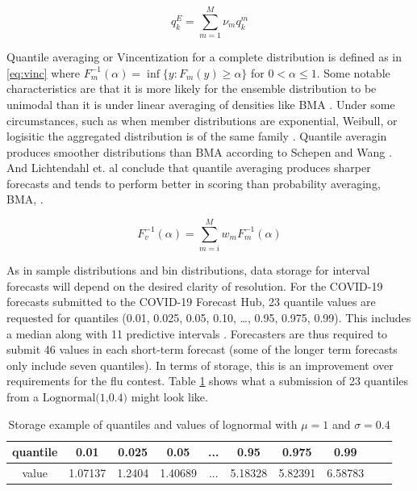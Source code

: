 \documentclass[11pt,notitlepage]{isuthesis}
\begin{document}
\begin{equation}
\label{eq:qa}
  q^E_k = \sum_{m=1}^M \nu_m q_k^m 
\end{equation}



Quantile averaging or Vincentization for a complete distribution is defined as
in \eqref{eq:vinc}
where $F_m^{-1} (\alpha) = \inf \{y:F_m(y) \geq \alpha\}$ for 
$0 < \alpha \leq 1$. Some notable characteristics are that it is more likely for
the ensemble distribution
to be unimodal than it is under linear averaging of densities like BMA 
\cite{busetti2017quantile}. Under some circumstances, such as when member
distributions are exponential, Weibull, or logisitic the aggregated distribution
is of the same family \cite{ratcliff1979group}. Quantile averagin produces 
smoother
distributions than BMA according to Schepen and Wang \cite{schepen2015model}.
And Lichtendahl et. al conclude that quantile averaging produces sharper 
forecasts
and tends to perform better in scoring than probability averaging, BMA,
\cite{lichtendahl2013better}.

\begin{equation}
\label{eq:vinc}
  F_v^{-1}(\alpha) = \sum_{m=i}^M w_m F_m^{-1} (\alpha)
\end{equation}


As in sample distributions and bin distributions, 
data storage for interval forecasts will
depend on the desired clarity of resolution. For the COVID-19 forecasts 
submitted to the COVID-19 Forecast Hub, 23 quantile values are requested for 
quantiles (0.01, 0.025, 0.05, 0.10, …, 0.95, 0.975, 0.99). This includes a 
median along with 11 predictive intervals \cite{bracher2021evaluating}. 
Forecasters are thus required to submit 46 values in each short-term forecast 
(some of the longer term forecasts only include seven quantiles). In terms of 
storage, this is an improvement over requirements for the flu contest. Table
\ref{table:qstor} shows what a submission of 23 quantiles from a 
$\mbox{Lognormal(1,0.4)}$ might look like.



\begin{table}[h!]
\centering
\begin{center}

\captionsetup{font=scriptsize}

 \begin{tabular}{|c||c|c|c|c|c|c|c|c|c|}
 \hline
    quantile & 0.01 & 0.025 & 0.05  & ...  & 0.95 & 0.975 & 0.99 \\ \hline
    value & 1.07137 & 1.2404 & 1.40689 & ... & 5.18328 &
    5.82391 & 6.58783 \\
    
 \hline
 \end{tabular}
 \begin{minipage}{10cm}
 \caption[Quantile/interval and values storage]{Storage example of quantiles 
 and values of lognormal with $\mu = 1$ and $\sigma = 0.4$}
 \label{table:qstor}
 \end{minipage}
 \end{center}
\end{table}
\end{document}
